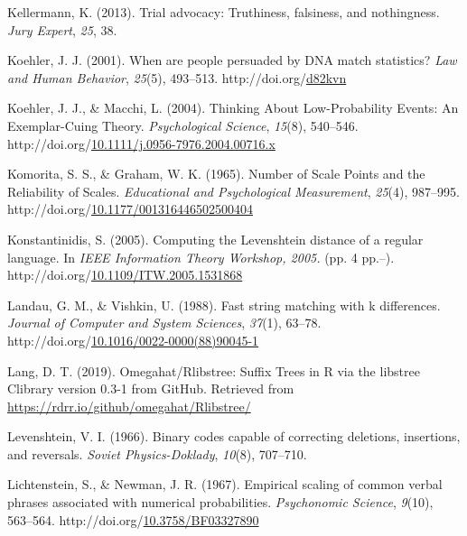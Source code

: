\documentclass[print]{nuthesis}
\newlength{\cslhangindent}
\newenvironment{CSLReferences}[2]%
{\setlength{\parindent}{0pt}%
\everypar{\setlength{\hangindent}{\cslhangindent}}\ignorespaces}%
{\par}
\begin{document}
\begin{CSLReferences}{1}{0}
\leavevmode{}%
Kellermann, K. (2013). Trial advocacy: {Truthiness}, falsiness, and nothingness. \emph{Jury Expert}, \emph{25}, 38.

\leavevmode{}%
Koehler, J. J. (2001). When are people persuaded by {DNA} match statistics? \emph{Law and Human Behavior}, \emph{25}(5), 493--513. http://doi.org/\href{https://doi.org/d82kvn}{d82kvn}

\leavevmode{}%
Koehler, J. J., \& Macchi, L. (2004). Thinking {About} {Low}-{Probability} {Events}: {An} {Exemplar}-{Cuing} {Theory}. \emph{Psychological Science}, \emph{15}(8), 540--546. http://doi.org/\href{https://doi.org/10.1111/j.0956-7976.2004.00716.x}{10.1111/j.0956-7976.2004.00716.x}

\leavevmode{}%
Komorita, S. S., \& Graham, W. K. (1965). Number of {Scale} {Points} and the {Reliability} of {Scales}. \emph{Educational and Psychological Measurement}, \emph{25}(4), 987--995. http://doi.org/\href{https://doi.org/10.1177/001316446502500404}{10.1177/001316446502500404}

\leavevmode{}%
Konstantinidis, S. (2005). Computing the {Levenshtein} distance of a regular language. In \emph{{IEEE} {Information} {Theory} {Workshop}, 2005.} (pp. 4 pp.--). http://doi.org/\href{https://doi.org/10.1109/ITW.2005.1531868}{10.1109/ITW.2005.1531868}

\leavevmode{}%
Landau, G. M., \& Vishkin, U. (1988). Fast string matching with k differences. \emph{Journal of Computer and System Sciences}, \emph{37}(1), 63--78. http://doi.org/\href{https://doi.org/10.1016/0022-0000(88)90045-1}{10.1016/0022-0000(88)90045-1}

\leavevmode{}%
Lang, D. T. (2019). Omegahat/{Rlibstree}: {Suffix} {Trees} in {R} via the libstree {Clibrary} version 0.3-1 from {GitHub}. Retrieved from \url{https://rdrr.io/github/omegahat/Rlibstree/}

\leavevmode{}%
Levenshtein, V. I. (1966). Binary codes capable of correcting deletions, insertions, and reversals. \emph{Soviet Physics-Doklady}, \emph{10}(8), 707--710.

\leavevmode{}%
Lichtenstein, S., \& Newman, J. R. (1967). Empirical scaling of common verbal phrases associated with numerical probabilities. \emph{Psychonomic Science}, \emph{9}(10), 563--564. http://doi.org/\href{https://doi.org/10.3758/BF03327890}{10.3758/BF03327890}


\end{CSLReferences}
\end{document}
